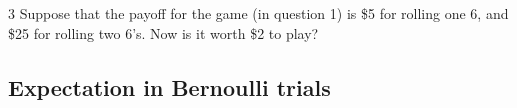\documentclass[a4paper,12pt]{book}
\newcounter{question}
\begin{document}
        \begin{question}{\thequestion}{3}
	        Suppose that the payoff for the game (in question 1) is \$5
	        for rolling one 6, and \$25 for rolling two 6's. Now is it worth \$2 to play?
	        
		\end{question}

		\newpage
		
		\subsection{Expectation in Bernoulli trials}
        
\end{document}
